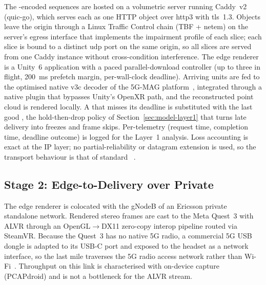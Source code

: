 The \vpcc-encoded sequences are hosted on a volumetric server running
Caddy~v2 (quic-go), which serves each \gof as one HTTP object over
\gls{http3} with \gls{tls}~1.3. Objects leave the origin through a Linux
Traffic Control chain (TBF + netem) on the server's egress interface
that implements the impairment profile of each slice; each slice is
bound to a distinct \gls{udp} port on the same origin, so all slices are
served from one Caddy instance without cross-condition interference.
The edge renderer is a Unity~6 application with a paced
parallel-download controller (up to three \gofs in flight,
\SI{200}{\milli\second} prefetch margin, per-\gof wall-clock
deadline). Arriving units are fed to the optimised native \gls{v3c} decoder
of the 5G-MAG platform~\cite{fivegmag}, integrated through a native
plugin that bypasses Unity's OpenXR path, and the reconstructed point
cloud is rendered locally. A \gof that misses its deadline is
substituted with the last good \gof, the hold-then-drop policy of
Section~\ref{sec:model-layer1} that turns late delivery into freezes
and frame skips. Per-\gof telemetry (request time,
completion time, deadline outcome) is logged for the Layer~1 analysis.
Loss accounting is exact at the IP layer; no partial-reliability or
datagram extension is used, so the transport behaviour is that of
standard \quic~\cite{rfc9000}.

\subsection{Stage 2: Edge-to-\hmd Delivery over Private \fiveg}
\label{sec:sys-stage2}
The edge renderer is colocated with the gNodeB of an Ericsson private
\fiveg standalone network. Rendered stereo frames are cast to the Meta
Quest~3 with ALVR through an OpenGL$\to$DX11 zero-copy interop pipeline
routed via SteamVR. Because the Quest~3 has no native 5G radio, a
commercial 5G USB dongle is adapted to its USB-C port and exposed to
the headset as a network interface, so the last mile traverses the 5G
radio access network rather than Wi-Fi~\cite{vquest2026}. Throughput
on this link is characterised with on-device capture (PCAPdroid) and
is not a bottleneck for the ALVR stream.

